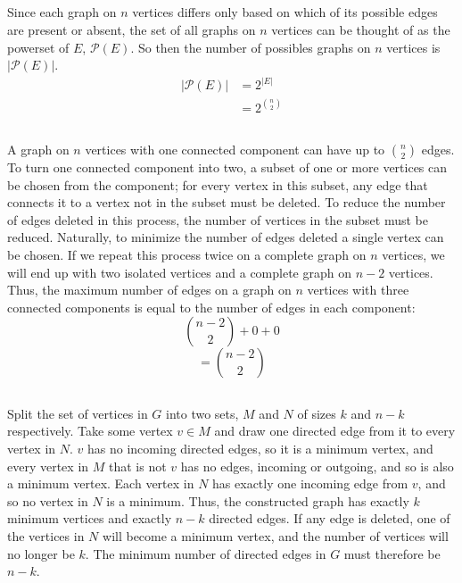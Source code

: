 \documentclass{article}
\begin{document}
\subsection{}
	Since each graph on $n$ vertices differs only based on which of its possible edges are present or absent,
	the set of all graphs on $n$ vertices can be thought of as the powerset of $E$, $\mathcal{P}(E)$.
	So then the number of possibles graphs on $n$ vertices is $|\mathcal{P}(E)|$.
	\begin{align*}
		|\mathcal{P}(E)| &= 2^{|E|}\\
		&= 2^{\binom{n}{2}}
	\end{align*}
\subsection{}
	A graph on $n$ vertices with one connected component can have up to $\binom{n}{2}$ edges.
	To turn one connected component into two, a subset of one or more vertices can be chosen
	from the component; for every vertex in this subset, any edge that connects it to a vertex
	not in the subset must be deleted. To reduce the number of edges deleted in this process,
	the number of vertices in the subset must be reduced. Naturally, to minimize the number of
	edges deleted a single vertex can be chosen. If we repeat this process twice on a complete
	graph on $n$ vertices, we will end up with two isolated vertices and a complete graph on $n-2$
	vertices. Thus, the maximum number of edges on a graph on $n$ vertices with three connected
	components is equal to the number of edges in each component:
	\[\binom{n-2}{2}+0+0\]
	\[=\binom{n-2}{2}\]
\subsection{}
	Split the set of vertices in $G$ into two sets, $M$ and $N$ of sizes $k$ and $n-k$ respectively. Take some vertex
	$v\in{M}$ and draw one directed edge from it to every vertex in $N$. $v$ has no incoming directed edges, so it is a
	minimum vertex, and every vertex in $M$ that is not $v$ has no edges, incoming or outgoing, and so is also a minimum
	vertex. Each vertex in $N$ has exactly one incoming edge from $v$, and so no vertex in $N$ is a minimum. Thus, the
	constructed graph has exactly $k$ minimum vertices and exactly $n-k$ directed edges. If any edge is deleted, one of
	the vertices in $N$ will become a minimum vertex, and the number of vertices will no longer be $k$. The
	minimum number of directed edges in $G$ must therefore be $n-k$.
\end{document}
